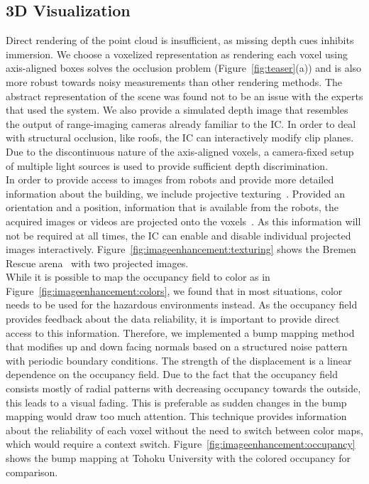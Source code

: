 \documentclass{egpubl}
\begin{document}
\subsection{3D Visualization} \label{sec:overview:3dvisualization}
 Direct rendering of the point cloud is insufficient, as missing depth cues inhibits immersion. We choose a voxelized representation as rendering each voxel using axis-aligned boxes solves the occlusion problem (Figure~\ref{fig:teaser}(a)) and is also more robust towards noisy measurements than other rendering methods. The abstract representation of the scene was found not to be an issue with the experts that used the system. We also provide a simulated depth image that resembles the output of range-imaging cameras already familiar to the IC. In order to deal with structural occlusion, like roofs, the IC can interactively modify clip planes. Due to the discontinuous nature of the axis-aligned voxels, a camera-fixed setup of multiple light sources is used to provide sufficient depth discrimination.\\
%
 In order to provide access to images from robots and provide more detailed information about the building, we include projective texturing~\cite{everitt2001projective}. Provided an orientation and a position, information that is available from the robots, the acquired images or videos are projected onto the voxels~\cite{1453517}. As this information will not be required at all times, the IC can enable and disable individual projected images interactively. Figure~\ref{fig:imageenhancement:texturing} shows the Bremen Rescue arena~\cite{varsadan08} with two projected images.\\
%
  While it is possible to map the occupancy field to color as in Figure~\ref{fig:imageenhancement:colors}, we found that in most situations, color needs to be used for the hazardous environments instead. As the occupancy field provides feedback about the data reliability, it is important to provide direct access to this information. Therefore, we implemented a bump mapping method that modifies up and down facing normals based on a structured noise pattern with periodic boundary conditions. The strength of the displacement is a linear dependence on the occupancy field. Due to the fact that the occupancy field consists mostly of radial patterns with decreasing occupancy towards the outside, this leads to a visual fading. This is preferable as sudden changes in the bump mapping would draw too much attention. This technique provides information about the reliability of each voxel without the need to switch between color maps, which would require a context switch. Figure~\ref{fig:imageenhancement:occupancy} shows the bump mapping at Tohoku University with the colored occupancy for comparison.\\
\end{document}
